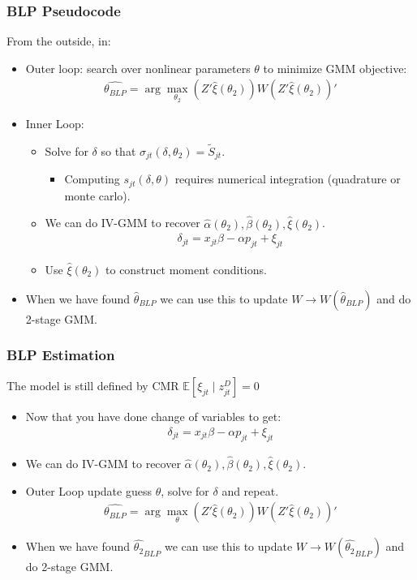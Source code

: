 \documentclass[aspectratio=169,10pt]{beamer}
\begin{document}
 \begin{frame}
\frametitle{BLP Pseudocode}
\footnotesize
From the outside, in:
\begin{itemize}
\item Outer loop: search over nonlinear parameters $\theta$ to minimize GMM objective:
 \begin{eqnarray*}
 \widehat{\theta_{BLP}} = \arg \max_{\theta_2} (Z' \hat{\xi}(\theta_2)) W  (Z' \hat{\xi}(\theta_2))'
 \end{eqnarray*}
 \item Inner Loop:
 \begin{itemize}
\item Solve for $\delta$ so that $\sigma_{jt}(\delta,\theta_2) = \tilde{S}_{jt}$.
\begin{itemize}
\item Computing $s_{jt}(\delta,\theta)$ requires numerical integration (quadrature or monte carlo).
\end{itemize}
 \item We can do IV-GMM to recover $\hat{\alpha}(\theta_2),\hat{\beta}(\theta_2),\hat{\xi}(\theta_2)$.
  \begin{eqnarray*}
\delta_{jt}= x_{jt} \beta -\alpha p_{jt}+  \xi_{jt}
 \end{eqnarray*}
  \item Use $\hat{\xi}(\theta_2)$ to construct moment conditions.
 \end{itemize}
 \item When we have found $\hat{\theta}_{BLP}$ we can use this to update $W \rightarrow W(\hat{\theta}_{BLP})$ and do 2-stage GMM.
 \end{itemize}
\end{frame}




 \begin{frame}
\frametitle{BLP Estimation}
The model is still defined by CMR $\mathbb{E}[\xi_{jt} \mid  z_{jt}^D]=0$
\begin{itemize}
 \item Now that you have done change of variables to get:
 \begin{eqnarray*}
\delta_{jt}= x_{jt} \beta -\alpha p_{jt}+  \xi_{jt}
 \end{eqnarray*}
 \item We can do IV-GMM to recover $\hat{\alpha}(\theta_2),\widehat{\beta}(\theta_2),\widehat{\xi}(\theta_2)$.
 \item Outer Loop update guess $\theta$, solve for $\delta$ and repeat.
 \begin{eqnarray*}
 \widehat{\theta_{BLP}} = \arg \max_{\theta} (Z' \widehat{\xi}(\theta_2)) W  (Z' \widehat{\xi}(\theta_2))'
 \end{eqnarray*}
 \item When we have found $\widehat{\theta_2}_{BLP}$ we can use this to update $W \rightarrow W(\widehat{\theta_2}_{BLP})$ and do 2-stage GMM.
 \end{itemize}
\end{frame}
\end{document}
